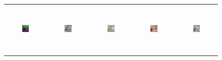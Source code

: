 \begin{figure}[]
\begin{tabular} {cc|cc|c}
\includegraphics[width=0.1932\textwidth,height=0.96in]{Images/Rec/ADE/label/ADE_val_00001517.png} & \includegraphics[width=0.1932\textwidth,height=0.96in]{Images/Rec/ADE/gt/ADE_val_00001517.jpg} &
\includegraphics[width=0.1932\textwidth,height=0.96in]{Images/Rec/ADE/pix2pixhd/ADE_val_00001517.jpg} &   \includegraphics[width=0.1932\textwidth,height=0.96in]{Images/Rec/ADE/spade/ADE_val_00001517.jpg} &  \includegraphics[width=0.1932\textwidth,height=0.96in]{Images/Rec/ADE/ours/ADE_val_00001517.png} \\


\end{tabular}
\end{figure}
